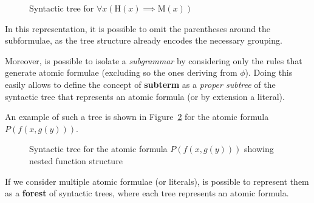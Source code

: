 \begin{figure}[H]
    \centering
    \caption{Syntactic tree for \(\forall x (\text{H}(x) \implies \text{M}(x))\)}\label{fig:syntactic_tree}
\end{figure}

In this representation, it is possible to omit the parentheses around the subformulae, as the tree structure already encodes the necessary grouping.

Moreover, is possible to isolate a \textit{subgrammar} by considering only the rules that generate atomic formulae (excluding so the ones deriving from \(\phi\)). Doing this easily allows to define the concept of \textbf{subterm} as a \textit{proper subtree} of the syntactic tree that represents an atomic formula (or by extension a literal).

An example of such a tree is shown in Figure~\ref{fig:subterm_tree} for the atomic formula \(P(f(x, g(y)))\).
\begin{figure}[H]
    \centering
    \caption{Syntactic tree for the atomic formula \(P(f(x, g(y)))\) showing nested function structure}\label{fig:subterm_tree}
\end{figure}

If we consider multiple atomic formulae (or literals), is possible to represent them as a \textbf{forest} of syntactic trees, where each tree represents an atomic formula.

